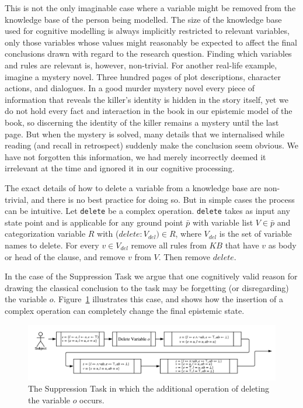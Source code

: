 \documentclass{article}
\begin{document}
This is not the only imaginable case where a variable might be removed from the knowledge base of the person being modelled. The size of the knowledge base used for cognitive modelling is always implicitly restricted to relevant variables, only those variables whose values might reasonably be expected to affect the final conclusions drawn with regard to the research question. Finding which variables and rules are relevant is, however, non-trivial. For another real-life example, imagine a mystery novel. Three hundred pages of plot descriptions, character actions, and dialogues. In a good murder mystery novel every piece of information that reveals the killer's identity is hidden in the story itself, yet we do not hold every fact and interaction in the book in our epistemic model of the book, so discerning the identity of the killer remains a mystery until the last page. But when the mystery is solved, many details that we internalised while reading (and recall in retrospect) suddenly make the conclusion seem obvious. We have not forgotten this information, we had merely incorrectly deemed it irrelevant at the time and ignored it in our cognitive processing.

The exact details of how to delete a variable from a knowledge base are non-trivial, and there is no best practice for doing so. But in simple cases the process can be intuitive. Let \texttt{delete} be a complex operation. \texttt{delete} takes as input any state point and is applicable for any ground point $\bar{p}$ with variable list $V \in \bar{p}$ and categorization variable $R$ with ($delete:V_{del}) \in R$, where $V_{del}$ is the set of variable names to delete. For every $v \in V_{del}$ remove all rules from $KB$ that have $v$ as body or head of the clause, and remove $v$ from $V$. Then remove $delete$.

In the case of the Suppression Task we argue that one cognitively valid reason for drawing the classical conclusion to the task may be forgetting (or disregarding) the variable $o$. Figure~\ref{fig:supmod} illustrates this case, and shows how the insertion of a complex operation can completely change the final epistemic state.

\begin{figure}
\begin{center}
\includegraphics[scale=0.7]{suppressionSCP_mod}
\end{center}

\caption{The Suppression Task in which the additional operation of deleting the variable $o$ occurs.}
\label{fig:supmod}
\end{figure}
\end{document}
